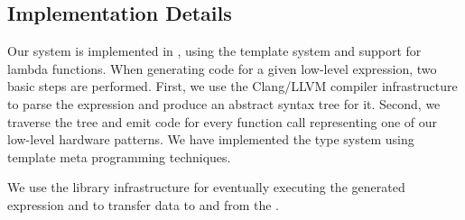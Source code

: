 \subsection{Implementation Details}
Our system is implemented in \Cpp, using the template system and support for lambda functions. 
When generating code for a given low-level expression, two basic steps are performed.
First, we use the Clang/LLVM compiler infrastructure to parse the expression and produce an abstract syntax tree for it.
Second, we traverse the tree and emit code for every function call representing one of our low-level hardware patterns.
We have implemented the type system using template meta programming techniques.

We use the \SkelCL library infrastructure for eventually executing the generated \OpenCL expression and to transfer data to and from the \GPU.



